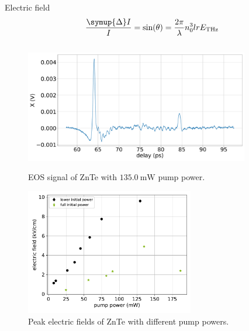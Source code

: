 \documentclass[aspectratio=1610, 9pt]{beamer}
\begin{document}
\begin{frame}{Electric field}
  \begin{equation}
    \frac{\symup{\Delta}I}{I} = \text{sin}(\theta) = \frac{2\pi}{\lambda} n_0^3 l r E_\text{THz}
  \end{equation}
  \begin{center}
  \begin{columns}
    \begin{column}{.5\textwidth}
      \begin{figure}
        \begin{overprint}
          \includegraphics[width=\textwidth]{images/2_11_30_20normalX.pdf}\caption{\textcolor{tugreen}{EOS signal} of ZnTe with $\SI{135.0}{\milli\W}$ pump power.}
          \includegraphics[width=0.75\textwidth]{images/eltric_field_ZnTe.pdf}\caption{\textcolor{tugreen}{Peak electric fields} of ZnTe with different pump powers.}
        \end{overprint}
      \end{figure}
  \end{column}
  \begin{column}{.5\textwidth}
    \begin{figure}

\end{figure}
\end{column}
\end{columns}
\end{center}
\end{frame}
\end{document}
